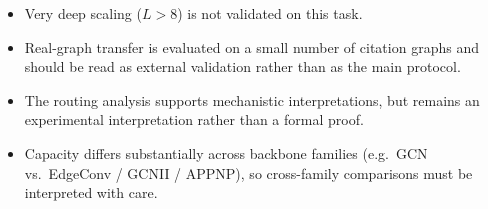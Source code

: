 \documentclass[11pt,a4paper]{article}
\begin{document}
\begin{itemize}
  \item Very deep scaling ($L > 8$) is not validated on this task.
  \item Real-graph transfer is evaluated on a small number of citation graphs
        and should be read as external validation rather than as the main
        protocol.
  \item The routing analysis supports mechanistic interpretations, but remains
        an experimental interpretation rather than a formal proof.
  \item Capacity differs substantially across backbone families
        (e.g.\ GCN vs.\ EdgeConv / GCNII / APPNP), so cross-family comparisons
        must be interpreted with care.
\end{itemize}
\end{document}
